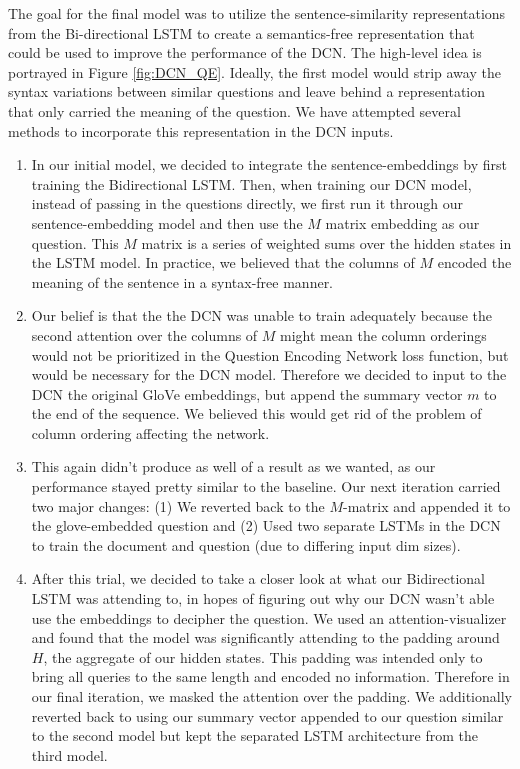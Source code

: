 \documentclass[a4paper, 11pt]{article}
\begin{document}
The goal for the final model was to utilize the sentence-similarity representations from the Bi-directional LSTM to create a semantics-free representation that could be used to improve the performance of the DCN. The high-level idea is portrayed in Figure \ref{fig:DCN_QE}. Ideally, the first model would strip away the syntax variations between similar questions and leave behind a representation that only carried the meaning of the question.  We have attempted several methods to incorporate this representation in the DCN inputs.
\begin{enumerate}[label=(\alph*)]
\item In our initial model, we decided to integrate the sentence-embeddings by first training the Bidirectional LSTM. Then, when training our DCN model, instead of passing in the questions directly, we first run it through our sentence-embedding model and then use the $M$ matrix embedding as our question. This $M$ matrix is a series of weighted sums over the hidden states in the LSTM model. In practice, we believed that the columns of $M$ encoded the meaning of the sentence in a syntax-free manner. 

\item Our belief is that the the DCN was unable to train adequately because the second attention over the columns of $M$ might mean the column orderings would not be prioritized in the Question Encoding Network loss function, but would be necessary for the DCN model. Therefore we decided to input to the DCN the original GloVe embeddings, but append the summary vector $m$ to the end of the sequence. We believed this would get rid of the problem of column ordering affecting the network. 

\item This again didn't produce as well of a result as we wanted, as our performance stayed pretty similar to the baseline. Our next iteration carried two major changes: (1) We reverted back to the $M$-matrix and appended it to the glove-embedded question and (2) Used two separate LSTMs in the DCN to train the document and question (due to differing input dim sizes). 

\item After this trial, we decided to take a closer look at what our Bidirectional LSTM was attending to, in hopes of figuring out why our DCN wasn't able use the embeddings to decipher the question. We used an attention-visualizer and found that the model was significantly attending to the padding around $H$, the aggregate of our hidden states. This padding was intended only to bring all queries to the same length and encoded no information. Therefore in our final iteration, we masked the attention over the padding. We additionally reverted back to using our summary vector appended to our question similar to the second model but kept the separated LSTM architecture from the third model.
\end{enumerate}
\end{document}
